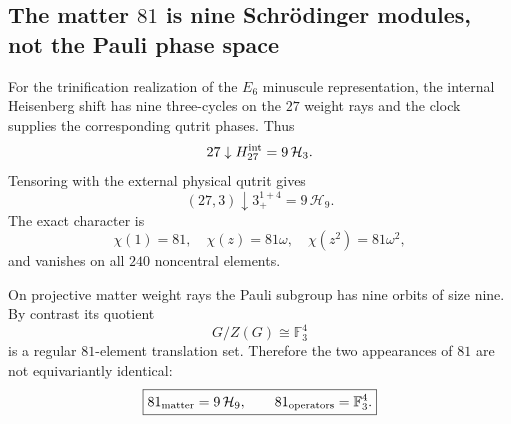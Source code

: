 \subsection*{The matter $81$ is nine Schr\"odinger modules, not the Pauli phase space}

For the trinification realization of the $E_6$ minuscule representation, the internal Heisenberg shift has nine three-cycles on the $27$ weight rays and the clock supplies the corresponding qutrit phases. Thus
\[
27\downarrow H_{27}^{\rm int}=9\,\mathcal H_3.
\]
Tensoring with the external physical qutrit gives
\[
\boxed{(27,3)\downarrow 3_+^{1+4}=9\,\mathcal H_9}.
\]
The exact character is
\[
\chi(1)=81,\quad \chi(z)=81\omega,\quad \chi(z^2)=81\omega^2,
\]
and vanishes on all $240$ noncentral elements.

On projective matter weight rays the Pauli subgroup has nine orbits of size nine. By contrast its quotient
\[
G/Z(G)\cong\mathbb F_3^4
\]
is a regular $81$-element translation set. Therefore the two appearances of $81$ are not equivariantly identical:
\[
\boxed{81_{\rm matter}=9\,\mathcal H_9,\qquad 81_{\rm operators}=\mathbb F_3^4.}
\]
